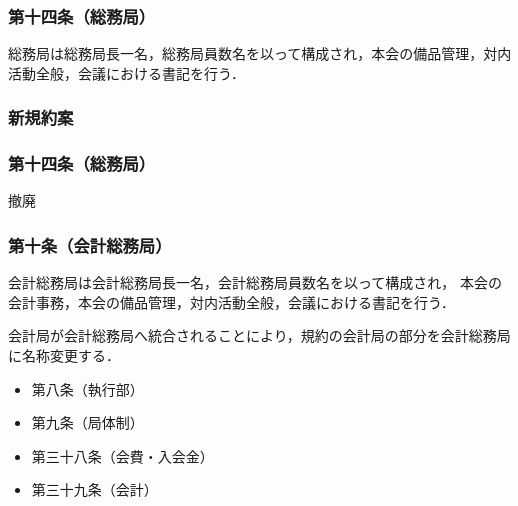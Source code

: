 \subsubsection*{第十四条（総務局）}
総務局は総務局長一名，総務局員数名を以って構成され，本会の備品管理，対内活動全般，会議における書記を行う．

\subsubsection*{新規約案}
\subsubsection*{第十四条（総務局）}
撤廃

\subsubsection*{第十条（会計総務局）}
会計総務局は会計総務局長一名，会計総務局員数名を以って構成され，
本会の会計事務，本会の備品管理，対内活動全般，会議における書記を行う．

会計局が会計総務局へ統合されることにより，規約の会計局の部分を会計総務局に名称変更する．
\begin{itemize}
  \item 第八条（執行部）
  \item 第九条（局体制）
  \item 第三十八条（会費・入会金）
  \item 第三十九条（会計）
\end{itemize}



